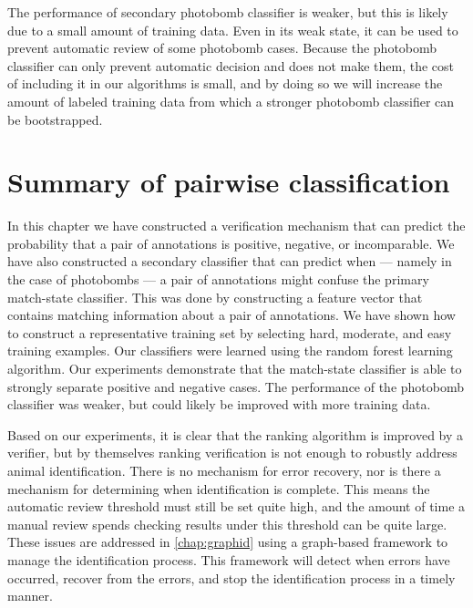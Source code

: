         The performance of secondary photobomb classifier is weaker, but this is likely due to a small amount of
          training data.
        Even in its weak state, it can be used to prevent automatic review of some photobomb cases.
        Because the photobomb classifier can only prevent automatic decision and does not make them, the cost of
          including it in our algorithms is small, and by doing so we will increase the amount of labeled training
          data from which a stronger photobomb classifier can be bootstrapped.


\section{Summary of pairwise classification}\label{sec:pairconclusion}

    In this chapter we have constructed a verification mechanism that can predict the probability that a pair of
      annotations is positive, negative, or incomparable.
    We have also constructed a secondary classifier that can predict when --- namely in the case of photobombs
      --- a pair of annotations might confuse the primary match-state classifier.
    This was done by constructing a feature vector that contains matching information about a pair of
      annotations.
    We have shown how to construct a representative training set by selecting hard, moderate, and easy training
      examples.
    Our classifiers were learned using the random forest learning algorithm.
    Our experiments demonstrate that the match-state classifier is able to strongly separate positive and
      negative cases.
    The performance of the photobomb classifier was weaker, but could likely be improved with more training data.

    Based on our experiments, it is clear that the ranking algorithm is improved by a verifier, but by themselves
      ranking verification is not enough to robustly address animal identification.
    There is no mechanism for error recovery, nor is there a mechanism for determining when identification is
      complete.
    This means the automatic review threshold must still be set quite high, and the amount of time a manual
      review spends checking results under this threshold can be quite large.
    These issues are addressed in \cref{chap:graphid} using a graph-based framework to manage the identification
      process.
    This framework will detect when errors have occurred, recover from the errors, and stop the identification
      process in a timely manner.


